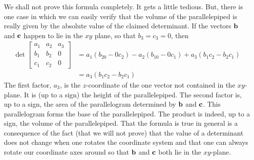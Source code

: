 We shall not prove this formula completely. It gets a little tedious.
But, there is one case in which we can easily verify that the volume of the 
parallelepiped is really given by the absolute value of the
claimed determinant. If the vectors $\mathbf{b}$ and $\mathbf{c}$ happen to lie
in the $xy$ plane, so that $b_3=c_3=0$, then 
\begin{align*}
\det\left[\begin{matrix}a_1&a_2&a_3\\ b_1&b_2&0\\ c_1&c_2&0\end{matrix}\right]
&=a_1(b_20-0c_2) -a_2(b_10-0c_1) +a_3(b_1c_2-b_2c_1)\\
&=a_3(b_1c_2-b_2c_1)
\end{align*}
The first factor, $a_3$, is the $z$-coordinate of the one vector not contained in the $xy$-plane. It 
is (up to a sign) the height of the parallelepiped. The second factor is,
up to a sign, the area of the parallelogram determined by $\mathbf{b}$
and $\mathbf{c}$. This parallelogram forms the base of the parallelepiped. 
The product is indeed, up to a sign, the volume of the parallelepiped.
That the formula is true in general is a consequence of the fact (that
we will not prove) that the value of a determinant does not change when
one rotates the coordinate system and that one can always rotate
our coordinate axes around so that $\mathbf{b}$ and $\mathbf{c}$ both lie in the
$xy$-plane. 


